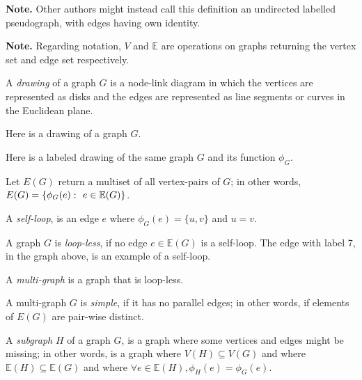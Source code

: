 \documentclass{article}
\begin{document}
	\textbf{Note.} Other authors might instead call this definition an undirected labelled pseudograph, with edges having own identity.
	
	\textbf{Note.} Regarding notation, $V$ and $\mathbb{E}$ are operations on graphs returning the vertex set and edge set respectively.

	A \textit{drawing} of a graph $G$ is a node-link diagram in which the vertices are represented as disks and the edges are represented as line segments or curves in the Euclidean plane.

	Here is a drawing of a graph $G$.

	\begin{center}
		
	\end{center}

	Here is a labeled drawing of the same graph $G$ and its function $\phi_G$.

	\begin{center}
		
	\end{center}

	Let $E(G)$ return a multiset of all vertex-pairs of $G$; in other words, $E(G) = \{\phi_G(e) \,\colon\  e \in \mathbb{E}(G)\}$.

	A \textit{self-loop}, is an edge $e$ where $\phi_G(e) = \{u,v\}$ and $u = v$.

	A graph $G$ is \textit{loop-less}, if no edge $e \in \mathbb{E}(G)$ is a self-loop. The edge with label 7, in the graph above, is an example of a self-loop.

	A \textit{multi-graph} is a graph that is loop-less.

	\begin{center}
		
	\end{center}

	A multi-graph $G$ is \textit{simple}, if it has no parallel edges; in other words, if elements of $E(G)$ are pair-wise distinct.

	\begin{center}
		
	\end{center}

	A \textit{subgraph} $H$ of a graph $G$, is a graph where some vertices and edges might be missing; in other words, is a graph where $V(H) \subseteq V(G)$ and where $\mathbb{E}(H) \subseteq \mathbb{E}(G)$ and where $\forall e \in \mathbb{E}(H), \phi_H(e) = \phi_G(e)$.

	\begin{center}
		
	\end{center}
\end{document}
